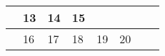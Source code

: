 {\begin{tabularx}{\linewidth}{|l!{\vrule width \myLenLineThicknessThick}*{7}{@{}X@{}|}}
       & 
    
      
      
        \begin{minipage}[t]{6mm}\centering{}13\end{minipage}
      
       & 
    
      
      
        \begin{minipage}[t]{6mm}\centering{}14\end{minipage}
      
       & 
    
      
      
        \begin{minipage}[t]{6mm}\centering{}15\end{minipage}
      
      
        \\  \hline 
      
    
  
  
  
  \hyperlink{week-2027-33}{} &
    
      
      
        \begin{minipage}[t]{6mm}\centering{}16\end{minipage}
      
       & 
    
      
      
        \begin{minipage}[t]{6mm}\centering{}17\end{minipage}
      
       & 
    
      
      
        \begin{minipage}[t]{6mm}\centering{}18\end{minipage}
      
       & 
    
      
      
        \begin{minipage}[t]{6mm}\centering{}19\end{minipage}
      
       & 
    
      
      
        \begin{minipage}[t]{6mm}\centering{}20\end{minipage}
      

\end{tabularx}}

